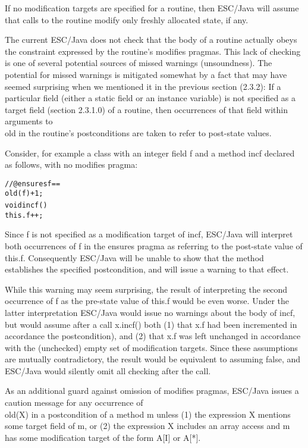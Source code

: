 \documentclass{acm_proc_article-sp}[10pt]
\begin{document}
If no modification targets are specified for a routine, then ESC/Java
will assume that calls to the routine modify only freshly allocated
state, if any.

The current ESC/Java does not check that the body of a routine
actually obeys the constraint expressed by the routine's modifies
pragmas.  This lack of checking is one of several potential sources of
missed warnings (unsoundness).  The potential for missed warnings is
mitigated somewhat by a fact that may have seemed surprising when we
mentioned it in the previous section (2.3.2): If a particular field
(either a static field or an instance variable) is not specified as a
target field (section 2.3.1.0) of a routine, then occurrences of that
field within arguments to \\old in the routine's postconditions are
taken to refer to post-state values.

Consider, for example a class with an integer field f and a method
incf declared as follows, with no modifies pragma:
\begin{alltt}
    //@ ensures f == \\old(f) + 1;
    void incf() {
      this.f++;
    }
\end{alltt}
    
Since f is not specified as a modification target of incf, ESC/Java
will interpret both occurrences of f in the ensures pragma as
referring to the post-state value of this.f.  Consequently ESC/Java
will be unable to show that the method establishes the specified
postcondition, and will issue a warning to that effect.

While this warning may seem surprising, the result of interpreting the
second occurrence of f as the pre-state value of this.f would be even
worse.  Under the latter interpretation ESC/Java would issue no
warnings about the body of incf, but would assume after a call
x.incf() both (1) that x.f had been incremented in accordance the
postcondition), and (2) that x.f was left unchanged in accordance with
the (unchecked) empty set of modification targets.  Since these
assumptions are mutually contradictory, the result would be equivalent
to assuming false, and ESC/Java would silently omit all checking after
the call.

As an additional guard against omission of modifies pragmas, ESC/Java
issues a caution message for any occurrence of \\old(X) in a
postcondition of a method m unless (1) the expression X mentions some
target field of m, or (2) the expression X includes an array access
and m has some modification target of the form A[I] or A[*].
\end{document}
